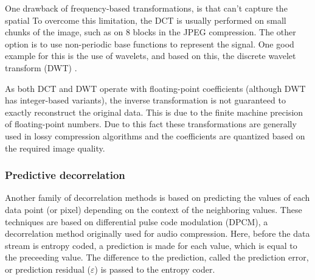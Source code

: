       One drawback of frequency-based transformations, is that can't capture the spatial 
      To overcome this limitation, the DCT is usually performed on small chunks of the image, such as on 8 blocks in the JPEG compression. The other option is to use non-periodic base functions to represent the signal. One good example for this is the use of wavelets, and based on this, the discrete wavelet transform (DWT) \cite{mallat_theory_1989, jensen_ripples_2001}.

      As both DCT and DWT operate with floating-point coefficients (although DWT has integer-based variants), the inverse transformation is not guaranteed to exactly reconstruct the original data. This is due to the finite machine precision of floating-point numbers. Due to this fact these transformations are generally used in lossy compression algorithms and the coefficients are quantized based on the required image quality.
      
      
  
      \subsubsection{Predictive decorrelation}
      \label{sec:predictors}
      Another family of decorrelation methods is based on predicting the values of each data point (or pixel) depending on the context of the neighboring values. These techniques are based on differential pulse code modulation (DPCM), a decorrelation method originally used for audio compression. Here, before the data stream is entropy coded, a prediction is made for each value, which is equal to the preceeding value. The difference to the prediction, called the prediction error, or prediction residual ($\varepsilon$) is passed to the entropy coder.

